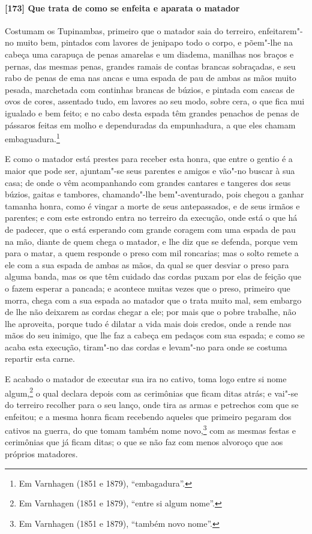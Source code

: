 \begin{linenumbers}
\paragraph{[173] Que trata de como se enfeita e aparata o matador}\quad
Costumam os Tupinambas, primeiro que o matador saia do terreiro, enfeitarem"-no muito bem,
pintados com lavores de jenipapo todo o corpo, e põem"-lhe na cabeça uma carapuça de penas
amarelas e um diadema, manilhas nos braços e pernas, das mesmas penas, grandes ramais de
contas brancas sobraçadas, e seu rabo de penas de ema nas ancas e uma espada de pau de
ambas as mãos muito pesada, marchetada com continhas brancas de búzios, e pintada com
cascas de ovos de cores, assentado tudo, em lavores ao seu modo, sobre cera, o que fica
mui igualado e bem feito; e no cabo desta espada têm grandes penachos de penas de pássaros
feitas em molho e dependuradas da empunhadura, a que eles chamam embaguadura.\footnote{ Em
Varnhagen (1851 e 1879), ``embagadura''.}

E como o matador está prestes para receber esta honra, que entre o gentio é a maior que
pode ser, ajuntam"-se seus parentes e amigos e vão"-no buscar à sua casa; de onde o vêm
acompanhando com grandes cantares e tangeres dos seus búzios, gaitas e tambores,
chamando"-lhe bem"-aventurado, pois chegou a ganhar tamanha honra, como é vingar a morte de
seus antepassados, e de seus irmãos e parentes; e com este estrondo entra no terreiro da
execução, onde está o que há de padecer, que o está esperando com grande coragem com uma
espada de pau na mão, diante de quem chega o matador, e lhe diz que se defenda, porque vem
para o matar, a quem responde o preso com mil roncarias; mas o solto remete a ele com a
sua espada de ambas as mãos, da qual se quer desviar o preso para alguma banda, mas os que
têm cuidado das cordas puxam por elas de feição que o fazem esperar a pancada; e acontece
muitas vezes que o preso, primeiro que morra, chega com a sua espada ao matador que o
trata muito mal, sem embargo de lhe não deixarem as cordas chegar a ele; por mais que o
pobre trabalhe, não lhe aproveita, porque tudo é dilatar a vida mais dois credos, onde a
rende nas mãos do seu inimigo, que lhe faz a cabeça em pedaços com sua espada; e como se
acaba esta execução, tiram"-no das cordas e levam"-no para onde se costuma repartir esta
carne.

E acabado o matador de executar sua ira no cativo, toma logo entre si nome
algum,\footnote{ Em Varnhagen (1851 e 1879), ``entre si algum nome''.} o qual declara
depois com as cerimônias que ficam ditas atrás; e vai"-se do terreiro recolher para o seu
lanço, onde tira as armas e petrechos com que se enfeitou; e a mesma honra ficam recebendo
aqueles que primeiro pegaram dos cativos na guerra, do que tomam também nome
novo,\footnote{ Em Varnhagen (1851 e 1879), ``também novo nome''.} com as mesmas festas e
cerimônias que já ficam ditas; o que se não faz com menos alvoroço que aos próprios
matadores.


\end{linenumbers}
